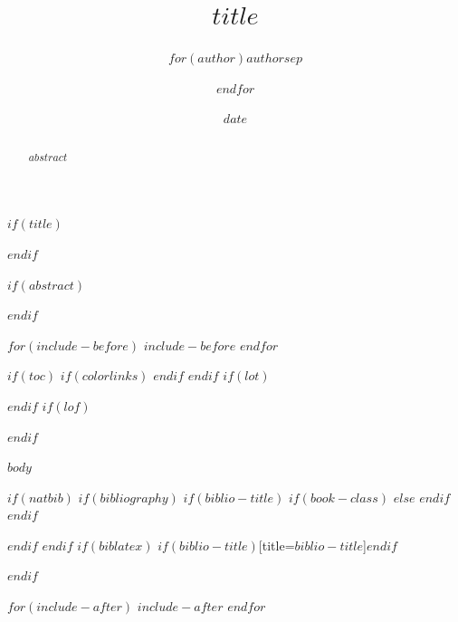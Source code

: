 \documentclass[$if(fontsize)$$fontsize$,$endif$$if(lang)$$lang$,$endif$$if(papersize)$$papersize$,$endif$$for(classoption)$$classoption$$sep$,$endfor$,justified]{$documentclass$}
\title{$title$}
\author{$for(author)$$author$$sep$ \and $endfor$}
\date{$date$}
\date{}
\begin{document}
$if(title)$
\maketitle
$endif$

$if(abstract)$
\begin{abstract}
\noindent $abstract$
\end{abstract}
$endif$

$for(include-before)$
$include-before$
$endfor$

$if(toc)$
{
$if(colorlinks)$
\hypersetup{linkcolor=$if(toccolor)$$toccolor$$else$black$endif$}
$endif$
\setcounter{tocdepth}{$toc-depth$}
\tableofcontents
}
$endif$
$if(lot)$
\listoftables
$endif$
$if(lof)$
\listoffigures
$endif$

$body$

$if(natbib)$
$if(bibliography)$
$if(biblio-title)$
$if(book-class)$
\renewcommand\bibname{$biblio-title$}
$else$
\renewcommand\refname{$biblio-title$}
$endif$
$endif$


$endif$
$endif$
$if(biblatex)$
\printbibliography$if(biblio-title)$[title=$biblio-title$]$endif$

$endif$

$for(include-after)$
$include-after$
$endfor$
\end{document}
